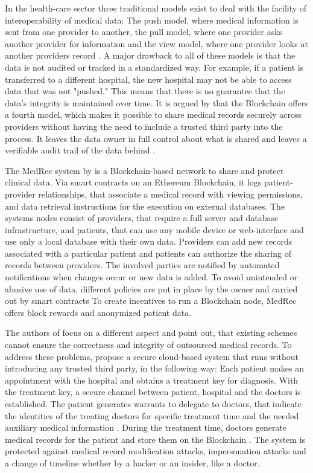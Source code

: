 In the health-care sector three traditional models exist to deal with the facility of interoperability of medical data: The push model, where medical information is sent from one provider to another, the pull model, where one provider asks another provider for information and the view model, where one provider looks at another providers record \cite{Kshetri2017}.
A major drawback to all of these models is that the data is not audited or tracked in a standardized way. For example, if a patient is transferred to a different hospital, the new hospital may not be able to access data that was not "pushed." This means that there is no guarantee that the data's integrity is maintained over time.
It is argued by \cite{Kshetri2017} that the Blockchain offers a fourth model, which makes it possible to share medical records securely across providers without having the need to include a trusted third party into the process. It leaves the data owner in full control about what is shared and leaves a verifiable audit trail of the data behind \cite{Kshetri2017}.

The MedRec system by \cite{Azaria2016} is a Blockchain-based network to share and protect clinical data. Via smart contracts on an Ethereum Blockchain, it logs patient-provider relationships, that associate a medical record with viewing permissions, and data retrieval instructions for the execution on external databases.
The systems nodes consist of providers, that require a full server and database infrastructure, and patients, that can use any mobile device or web-interface and use only a local database with their own data.
Providers can add new records associated with a particular patient and patients can authorize the sharing of records between providers. The involved parties are notified by automated notifications when changes occur or new data is added. To avoid unintended or abusive use of data, different policies are put in place by the owner and carried out by smart contracts
To create incentives to run a Blockchain node, MedRec offers block rewards and anonymized patient data.

The authors of\cite{Cao2019} focus on a different aspect and point out, that existing schemes cannot ensure the correctness and integrity of outsourced medical records.
To address these problems, \cite{Cao2019} propose a secure cloud-based system that runs without introducing any trusted third party, in the following way:
 Each patient makes an appointment with the hospital and obtains a treatment key for diagnosis. With the treatment key, a secure channel between patient, hospital and the doctors is established.
The patient generates warrants to delegate to doctors, that indicate the identities of the treating doctors for specific treatment time and the needed auxiliary medical information \cite{Cao2019}.
During the treatment time, doctors generate medical records for the patient and store them on the Blockchain \cite{Cao2019}.
The system is protected against medical record modification attacks, impersonation attacks and a change of timeline whether by a hacker or an insider, like a doctor.

